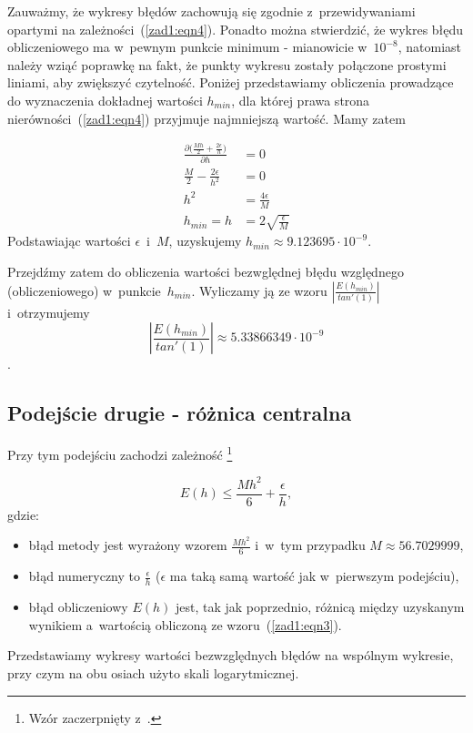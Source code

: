 Zauważmy, że wykresy błędów zachowują się zgodnie z~przewidywaniami opartymi na zależności~(\ref{zad1:eqn4}). Ponadto można stwierdzić, że wykres błędu obliczeniowego ma w~pewnym punkcie minimum - mianowicie w~$10^{-8}$, natomiast należy wziąć poprawkę na fakt, że punkty wykresu zostały połączone prostymi liniami, aby zwiększyć czytelność. Poniżej przedstawiamy obliczenia prowadzące do wyznaczenia dokładnej wartości $h_{min}$, dla której prawa strona nierówności~(\ref{zad1:eqn4}) przyjmuje najmniejszą wartość. Mamy zatem

\begin{align}
	\frac{\partial{(\frac{Mh}{2}+\frac{2\epsilon}{h}})}{\partial{h}} &= 0 \\
	\frac{M}{2}-\frac{2\epsilon}{h^2} &= 0 \\
	h^2 &= \frac{4\epsilon}{M} \\ 
	h_{min} = h &= 2\sqrt{\frac{\epsilon}{M}}
\end{align}
Podstawiając wartości $\epsilon$~i~$M$, uzyskujemy $h_{min} \approx 9.123695 \cdot 10^{-9}$.

Przejdźmy zatem do obliczenia wartości bezwględnej błędu względnego (obliczeniowego) w~punkcie~$h_{min}$. Wyliczamy ją ze wzoru $\left| \frac{E(h_{min})}{tan'(1)} \right|$ i~otrzymujemy 
$$
\left| \frac{E(h_{min})}{tan'(1)} \right| \approx 5.33866349 \cdot 10^{-9}
$$.

\newpage

\subsection{Podejście drugie - różnica centralna}

Przy tym podejściu zachodzi zależność \footnote{Wzór zaczerpnięty z~\cite{teams_materials}.}

\begin{equation}
	E(h) \le \frac{Mh^2}{6}+\frac{\epsilon}{h},
	\label{zad1:eqn9}
\end{equation}
gdzie:

\begin{itemize}
	\item błąd metody jest wyrażony wzorem $\frac{Mh^2}{6}$ i~w~tym przypadku $M \approx 56.7029999$, 
	\item błąd numeryczny to $\frac{\epsilon}{h}$ ($\epsilon$ ma taką samą wartość jak w~pierwszym podejściu),
	\item błąd obliczeniowy $E(h)$ jest, tak jak poprzednio, różnicą między uzyskanym wynikiem a~wartością obliczoną ze wzoru~(\ref{zad1:eqn3}).
\end{itemize}
Przedstawiamy wykresy wartości bezwzględnych błędów na wspólnym wykresie, przy czym na obu osiach użyto skali logarytmicznej.

